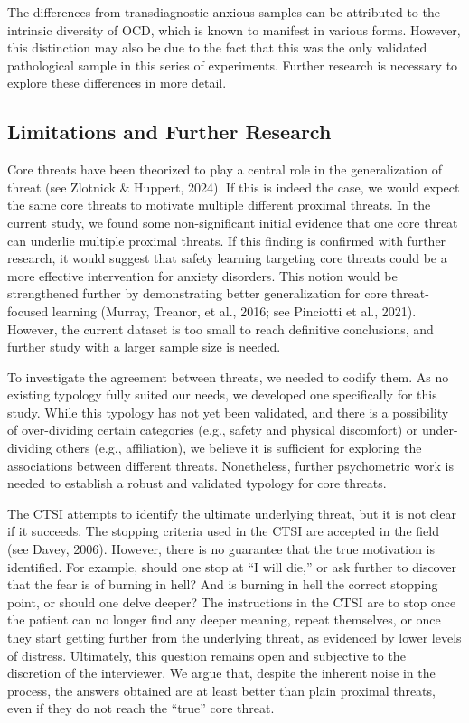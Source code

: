 \documentclass[
  man,floatsintext]{apa7}
\begin{document}
The differences from transdiagnostic anxious samples can be attributed to the intrinsic diversity of OCD, which is known to manifest in various forms.
However, this distinction may also be due to the fact that this was the only validated pathological sample in this series of experiments.
Further research is necessary to explore these differences in more detail.

\subsection{Limitations and Further Research}\label{limitations-and-further-research}

Core threats have been theorized to play a central role in the generalization of threat (see Zlotnick \& Huppert, 2024).
If this is indeed the case, we would expect the same core threats to motivate multiple different proximal threats.
In the current study, we found some non-significant initial evidence that one core threat can underlie multiple proximal threats.
If this finding is confirmed with further research, it would suggest that safety learning targeting core threats could be a more effective intervention for anxiety disorders.
This notion would be strengthened further by demonstrating better generalization for core threat-focused learning (Murray, Treanor, et al., 2016; see Pinciotti et al., 2021).
However, the current dataset is too small to reach definitive conclusions, and further study with a larger sample size is needed.

To investigate the agreement between threats, we needed to codify them.
As no existing typology fully suited our needs, we developed one specifically for this study.
While this typology has not yet been validated, and there is a possibility of over-dividing certain categories (e.g., safety and physical discomfort) or under-dividing others (e.g., affiliation), we believe it is sufficient for exploring the associations between different threats.
Nonetheless, further psychometric work is needed to establish a robust and validated typology for core threats.

The CTSI attempts to identify the ultimate underlying threat, but it is not clear if it succeeds.
The stopping criteria used in the CTSI are accepted in the field (see Davey, 2006).
However, there is no guarantee that the true motivation is identified.
For example, should one stop at ``I will die,'' or ask further to discover that the fear is of burning in hell?
And is burning in hell the correct stopping point, or should one delve deeper?
The instructions in the CTSI are to stop once the patient can no longer find any deeper meaning, repeat themselves, or once they start getting further from the underlying threat, as evidenced by lower levels of distress.
Ultimately, this question remains open and subjective to the discretion of the interviewer.
We argue that, despite the inherent noise in the process, the answers obtained are at least better than plain proximal threats, even if they do not reach the ``true'' core threat.
\end{document}
